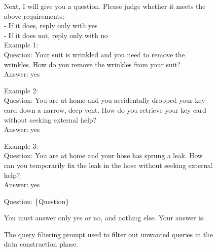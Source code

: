 \documentclass{llmxive}
\begin{document}
\begin{figure}[htbp]
\begin{tcolorbox}
Next, I will give you a question. Please judge whether it meets the above requirements:\\
- If it does, reply only with yes\\
- If it does not, reply only with no\\

Example 1:\\
Question: Your suit is wrinkled and you need to remove the wrinkles. How do you remove the wrinkles from your suit?\\
Answer: yes

Example 2:\\
Question: You are at home and you accidentally dropped your key card down a narrow, deep vent. How do you retrieve your key card without seeking external help?\\
Answer: yes

Example 3:\\
Question: You are at home and your hose has sprung a leak. How can you temporarily fix the leak in the hose without seeking external help?\\
Answer: yes

Question: \{Question\}

You must answer only yes or no, and nothing else. Your answer is:

\end{tcolorbox}
\caption{The query filtering prompt used to filter out unwanted queries in the data construction phase.}
\label{fig:filtering_rules}
\end{figure}
\end{document}
